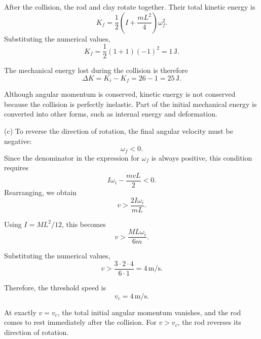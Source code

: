 \documentclass[12pt]{article}
\begin{document}
After the collision, the rod and clay rotate
together. Their total kinetic energy is
\begin{equation}
    K_f = \frac{1}{2}
    \left(I+\frac{mL^2}{4}\right)\omega_f^2.
\end{equation}
Substituting the numerical values,
\begin{equation}
    K_f = \frac{1}{2}(1+1)(-1)^2
    = 1\,\mathrm{J}.
\end{equation}

The mechanical energy lost during the collision is
therefore
\begin{equation}
    \Delta K = K_i-K_f
    = 26-1
    = \boxed{25\,\mathrm{J}}.
\end{equation}

Although angular momentum is conserved, kinetic
energy is not conserved because the collision is
perfectly inelastic. Part of the initial mechanical
energy is converted into other forms, such as
internal energy and deformation.


(c) To reverse the direction of rotation, the final
angular velocity must be negative:
\begin{equation}
    \omega_f < 0.
\end{equation}
Since the denominator in the expression for
$\omega_f$ is always positive, this condition
requires
\begin{equation}
    I\omega_i-\frac{mvL}{2}<0.
\end{equation}
Rearranging, we obtain
\begin{equation}
    v>\frac{2I\omega_i}{mL}.
\end{equation}

Using $I=ML^2/12$, this becomes
\begin{equation}
    v>\frac{ML\omega_i}{6m}.
\end{equation}

Substituting the numerical values,
\begin{equation}
    v>\frac{3\cdot 2\cdot 4}{6\cdot 1}
    = 4\,\mathrm{m/s}.
\end{equation}

Therefore, the threshold speed is
\begin{equation}
    \boxed{v_c=4\,\mathrm{m/s}}.
\end{equation}

At exactly $v=v_c$, the total initial angular
momentum vanishes, and the rod comes to rest
immediately after the collision. For $v>v_c$,
the rod reverses its direction of rotation.
\end{document}
